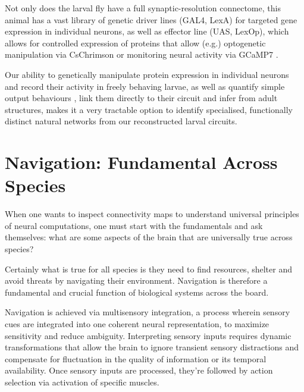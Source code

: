 Not only does the larval fly have a full synaptic-resolution connectome, this animal has a vast library of genetic driver lines (GAL4, LexA) for targeted gene expression in individual neurons, as well as effector line (UAS, LexOp), which allows for controlled expression of proteins that allow (e.g.) optogenetic manipulation via CsChrimson \citep{kim2015optogenetics} or monitoring neural activity via GCaMP7 \citep{owald2015light}. 

Our ability to genetically manipulate protein expression in individual neurons and record their activity in freely behaving larvae, as well as quantify simple output behaviours \citep{vogelstein2014discovery}, link them directly to their circuit and infer from adult structures, makes it a very tractable option to identify specialised, functionally distinct natural networks from our reconstructed larval circuits. %





\label{}


\section{Navigation: Fundamental Across Species} 
    When one wants to inspect connectivity maps to understand universal principles of neural computations, one must start with the fundamentals and ask themselves: what are some aspects of the brain that are universally true across species? 

    Certainly what is true for all species is they need to find resources, shelter and avoid threats by navigating their environment. Navigation is therefore a fundamental and crucial function of biological systems across the board. 

    Navigation is achieved via multisensory integration, a process wherein sensory cues are integrated into one coherent neural representation, to maximize sensitivity and reduce ambiguity. Interpreting sensory inputs requires dynamic transformations that allow the brain to ignore transient sensory distractions and compensate for fluctuation in the quality of information or its temporal availability. Once sensory inputs are processed, they're followed by action selection via activation of specific muscles. 
    
